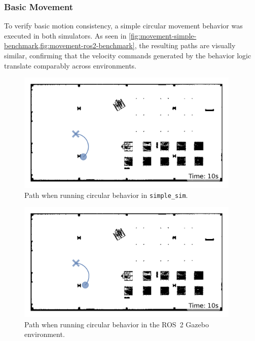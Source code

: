 \subsubsection{Basic Movement}
To verify basic motion consistency, a simple circular movement behavior was executed in both simulators. As seen in \cref{fig:movement-simple-benchmark,fig:movement-ros2-benchmark}, the resulting paths are visually similar, confirming that the velocity commands generated by the behavior logic translate comparably across environments.
\begin{figure}[H]
    \begin{center}
        \includegraphics[width=0.95\textwidth]{./figures/consistency/simple-sim-paths-(after-10s)_rough_tune.png}
    \end{center}
    \caption{Path when running circular behavior in \texttt{simple\_sim}.}
    \label{fig:movement-simple-benchmark}
\end{figure}
\begin{figure}[H]
    \begin{center}
        \includegraphics[width=0.95\textwidth]{./figures/consistency/ros-2-paths-(after-10s)_rough_tune.png}
    \end{center}
    \caption{Path when running circular behavior in the ROS~2 Gazebo environment.}
    \label{fig:movement-ros2-benchmark}
\end{figure}

